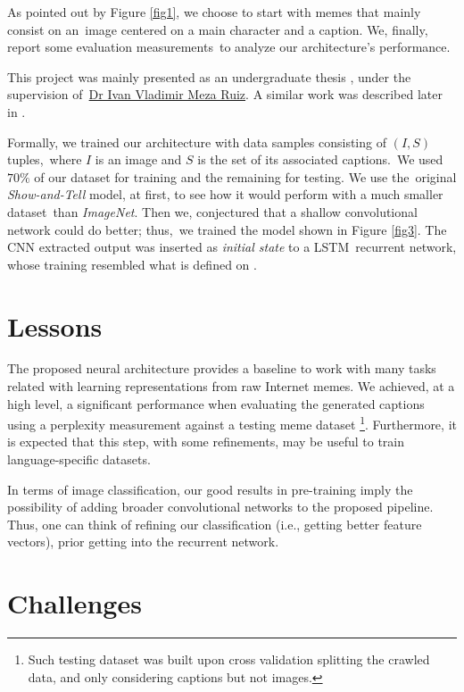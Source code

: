\documentclass[paper=letter, fontsize=11pt]{scrartcl}
\begin{document}
As pointed out by Figure \ref{fig1}, we choose to start with memes that mainly consist on an\
image centered on a main character and a caption. We, finally, report some evaluation measurements\
to analyze our architecture's performance.\par
This project was mainly presented as an undergraduate thesis \cite{tes.TES0100077017320180101}, under the supervision of\
\href{http://turing.iimas.unam.mx/~ivanvladimir/}{Dr Ivan Vladimir Meza Ruiz}. A similar work was described later in \cite{2018arXiv180604510P}.\par
Formally, we trained our architecture with data samples consisting of $(I, S)$ tuples,\
where $I$ is an image and $S$ is the set of its associated captions.\
We used $70\%$ of our dataset for training and the remaining for testing. We use the\
original \emph{Show-and-Tell} model, at first, to see how it would perform with a much smaller dataset\
than \emph{ImageNet}. Then we, conjectured that a shallow convolutional network could do better; thus,\
we trained the model shown in Figure \ref{fig3}.  
The CNN extracted output was inserted as \emph{initial state} to a LSTM\
recurrent network, whose training resembled what is defined on \cite{DBLP:journals/corr/VinyalsTBE14}.

\section*{Lessons}

\noindent
The proposed neural architecture provides a baseline to work with many tasks related with learning representations from raw Internet memes. We achieved, at a high level, a significant performance when evaluating the generated captions using a perplexity measurement against a testing meme dataset%
\footnote{
    Such testing dataset was built upon cross validation splitting the crawled data, and only considering captions but not images.
}. Furthermore, it is expected that this step, with some refinements, may be useful to train language-specific datasets.\par
In terms of image classification, our good results in pre-training imply the possibility of adding broader convolutional networks to the proposed pipeline. Thus, one can think of refining our classification (i.e., getting better feature vectors), prior getting into the recurrent network.

\section*{Challenges}
\end{document}
